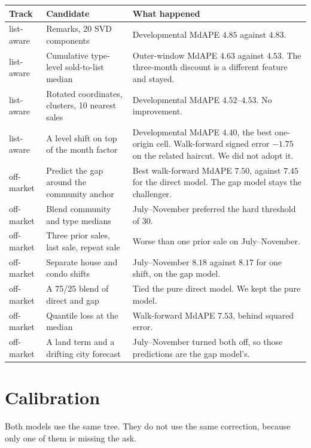 \documentclass[11pt]{article}
\newcommand{\la}{list-aware}
\newcommand{\om}{off-market}
\begin{document}
\begin{center}
\small
\begin{tabular}{p{2.2cm}p{4.6cm}p{7.4cm}}
\toprule
Track & Candidate & What happened \\
\midrule
\la & Remarks, 20 SVD components & Developmental MdAPE \(4.85\) against \(4.83\). \\
\la & Cumulative type-level sold-to-list median & Outer-window MdAPE \(4.63\) against \(4.53\). The three-month discount is a different feature and stayed. \\
\la & Rotated coordinates, clusters, 10 nearest sales & Developmental MdAPE \(4.52\)--\(4.53\). No improvement. \\
\la & A level shift on top of the month factor & Developmental MdAPE \(4.40\), the best one-origin cell. Walk-forward signed error \(-1.75\) on the related haircut. We did not adopt it. \\
\om & Predict the gap around the community anchor & Best walk-forward MdAPE \(7.50\), against \(7.45\) for the direct model. The gap model stays the challenger. \\
\om & Blend community and type medians & July--November preferred the hard threshold of 30. \\
\om & Three prior sales, last sale, repeat sale & Worse than one prior sale on July--November. \\
\om & Separate house and condo shifts & July--November \(8.18\) against \(8.17\) for one shift, on the gap model. \\
\om & A 75/25 blend of direct and gap & Tied the pure direct model. We kept the pure model. \\
\om & Quantile loss at the median & Walk-forward MdAPE \(7.53\), behind squared error. \\
\om & A land term and a drifting city forecast & July--November turned both off, so those predictions are the gap model's. \\
\bottomrule
\end{tabular}
\end{center}

\section{Calibration}
\label{sec:calibration}

Both models use the same tree. They do not use the same correction, because only one of them is missing the ask.
\end{document}
